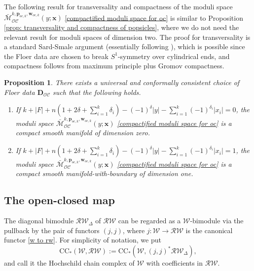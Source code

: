 \documentclass[11pt]{amsproc}
\def\w{\mathcal{W}(E)}
\def\oc{\mathcal{OC}}
\def\r#1{\mathrm{#1}}
\def\w{\mathcal{W}}
\def\rw{\mathcal{RW}}
\def\d{\delta}
\def\D{\Delta}
\def\M{\mathcal{M}}
\newtheorem{prop}[lem]{Proposition}
\theoremstyle{remark}
\numberwithin{equation}{section}
\begin{document}
The following result for transversality and compactness of the moduli space $\bar{\M}_{\oc}^{k, \mathbf{p}_{oc, k}, \mathbf{w}_{oc, k}}(y; \mathbf{x})$ \eqref{compactified moduli space for oc} is similar to Proposition \ref{prop: transversality and compactness of popsicles},
where we do not need the relevant result for moduli spaces of dimension two.
The proof for transversality is a standard Sard-Smale argument (essentially following \cites{abouzaid_gc, seidel_book}),
which is possible since the Floer data are chosen to break $S^{1}$-symmetry over cylindrical ends,
and compactness follows from maximum principle plus Gromov compactness.

\begin{prop}\label{prop: transversality and compactness of oc moduli space}
There exists a universal and conformally consistent choice of Floer data $\mathbf{D}_{\oc}$ such that the following holds.
\begin{enumerate}[label=(\roman*)]

\item If $k + |F| + n(1+2\d+\sum_{i=1}^{k}\d_{i}) - (-1)^{\d}|y| - \sum_{i=1}^{k} (-1)^{\d_{i}}|x_{i}|=0$, 
the moduli space $\bar{\M}_{\oc}^{k, \mathbf{p}_{oc, k}, \mathbf{w}_{oc, k}}(y; \mathbf{x})$ \eqref{compactified moduli space for oc} is a compact smooth manifold of dimension zero.

\item If $k + |F| + n(1+2\d+\sum_{i=1}^{k}\d_{i}) - (-1)^{\d}|y| - \sum_{i=1}^{k} (-1)^{\d_{i}}|x_{i}|=1$, 
the moduli space $\bar{\M}_{\oc}^{k, \mathbf{p}_{oc, k}, \mathbf{w}_{oc, k}}(y; \mathbf{x})$ \eqref{compactified moduli space for oc} is a compact smooth manifold-with-boundary of dimension one.

\end{enumerate}
\end{prop}

\subsection{The open-closed map}

The diagonal bimodule $\rw_{\D}$ of $\rw$ can be regarded as a $\w$-bimodule via the pullback by the pair of functors $(j, j)$,
where $j: \w \to \rw$ is the canonical functor \eqref{w to rw}.
For simplicity of notation, we put
\begin{equation}
\r{CC}_{*}(\w, \rw) := \r{CC}_{*}(\w, (j, j)^{*}\rw_{\D}),
\end{equation}
and call it the Hochschild chain complex of $\w$ with coefficients in $\rw$.
\end{document}
